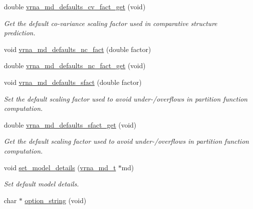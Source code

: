 \begin{DoxyCompactItemize}
double \mbox{\hyperlink{group__model__details_gae59c68393807217b0a2497adb64d3ee3}{vrna\+\_\+md\+\_\+defaults\+\_\+cv\+\_\+fact\+\_\+get}} (void)
\begin{DoxyCompactList}\small\item\em Get the default co-\/variance scaling factor used in comparative structure prediction. \end{DoxyCompactList}\item 
void \mbox{\hyperlink{group__model__details_gac35e596c850dce3ad55c49119fd7d471}{vrna\+\_\+md\+\_\+defaults\+\_\+nc\+\_\+fact}} (double factor)
\item 
double \mbox{\hyperlink{group__model__details_ga7ac759eaa7159bf5f022745f5da59508}{vrna\+\_\+md\+\_\+defaults\+\_\+nc\+\_\+fact\+\_\+get}} (void)
\item 
void \mbox{\hyperlink{group__model__details_ga3f73d3029d3d0025d4cc311510cd95a3}{vrna\+\_\+md\+\_\+defaults\+\_\+sfact}} (double factor)
\begin{DoxyCompactList}\small\item\em Set the default scaling factor used to avoid under-\//overflows in partition function computation. \end{DoxyCompactList}\item 
double \mbox{\hyperlink{group__model__details_gab2df6aab954b63fd3592d18e90285dae}{vrna\+\_\+md\+\_\+defaults\+\_\+sfact\+\_\+get}} (void)
\begin{DoxyCompactList}\small\item\em Get the default scaling factor used to avoid under-\//overflows in partition function computation. \end{DoxyCompactList}\item 
void \mbox{\hyperlink{group__model__details_gabad896c3650d420f3f3ddefc69e2bceb}{set\+\_\+model\+\_\+details}} (\mbox{\hyperlink{group__model__details_ga1f8a10e12a0a1915f2a4eff0b28ea17c}{vrna\+\_\+md\+\_\+t}} $\ast$md)
\begin{DoxyCompactList}\small\item\em Set default model details. \end{DoxyCompactList}\item 
char $\ast$ \mbox{\hyperlink{group__model__details_ga0ca65d37c515d6d36b06d3db1abb69d3}{option\+\_\+string}} (void)
\end{DoxyCompactItemize}
